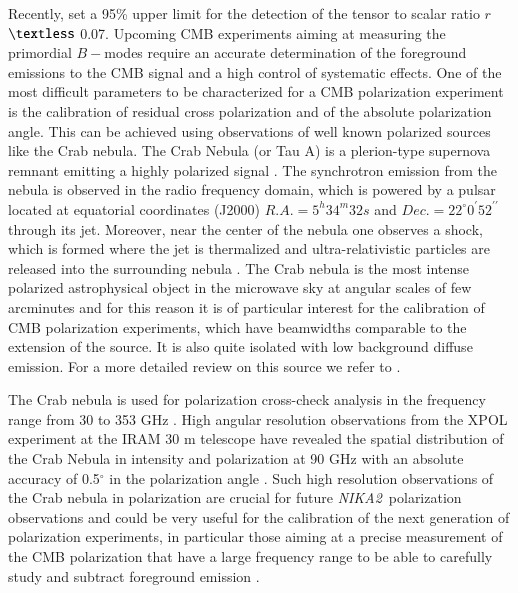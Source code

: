 \documentclass[twocolumn,traditabstract]{aa}
\def\NIKAd{\textit{NIKA2}}
\begin{document}
Recently, \citet{bicepplanck2015,bicep2016} set a 95\% upper limit for the
detection of the tensor to scalar ratio $r$ $\textless$ 0.07.  Upcoming CMB
experiments aiming at measuring the primordial $B-$modes require an accurate
determination of the foreground emissions to the CMB signal and a high control
of systematic effects. One of the most difficult parameters to be characterized
for a CMB polarization experiment is the calibration of residual cross
polarization and of the absolute polarization angle. This can be achieved using
observations of well known polarized sources like the Crab nebula. The Crab
Nebula (or Tau A) is a plerion-type supernova remnant emitting a highly
polarized signal \citep{1978A&A....70..419W,1991ApJ...368..463M}.  The
synchrotron emission from the nebula is observed in the radio frequency domain,
which is powered by a pulsar located at equatorial coordinates (J2000) $R.A. =
5^h34^m32s$ and $Dec. = 22^{\circ}0^{\prime}52^{\prime\prime}$ through its jet.
Moreover, near the center of the nebula one observes a shock, which is formed
where the jet is thermalized and ultra-relativistic particles are released into
the surrounding nebula \citep{2000ApJ...536L..81W,2011A&A...528A..11W}. The Crab
nebula is the most intense polarized astrophysical object in the microwave sky
at angular scales of few arcminutes and for this reason it is of particular
interest for the calibration of CMB polarization experiments, which have
beamwidths comparable to the extension of the source. It is also quite isolated
with low background diffuse emission. For a more detailed review on this source
we refer to \citet{2008ARA&A..46..127H}.

The Crab nebula is used for polarization cross-check analysis in the frequency
range from 30 to 353 GHz \citep{2011ApJS..192...19W,2015arXiv150702058P}. High
angular resolution observations from the XPOL experiment \citep{thum2008} at the
IRAM 30 m telescope have revealed the spatial distribution of the Crab Nebula in
intensity and polarization at 90 GHz with an absolute accuracy of 0.5$^{\circ}$
in the polarization angle \citep{aumont2010}. Such high resolution observations
of the Crab nebula in polarization are crucial for future \NIKAd\ polarization
observations and could be very useful for the calibration of the next generation
of polarization experiments, in particular those aiming at a precise measurement
of the CMB polarization that have a large frequency range to be able to
carefully study and subtract foreground emission \citep{2016IJMPD..2540008K}.
\end{document}
